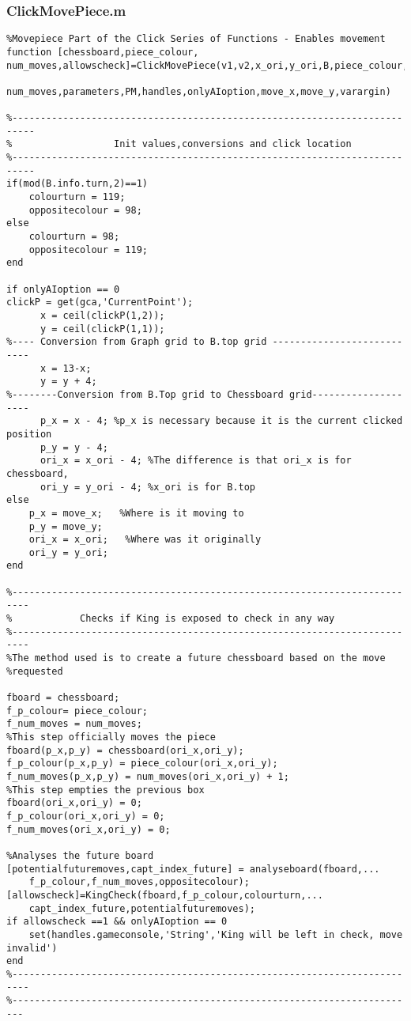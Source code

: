 \documentclass{article}
\begin{document}
\subsubsection{ClickMovePiece.m}
\begin{lstlisting}
%Movepiece Part of the Click Series of Functions - Enables movement
function [chessboard,piece_colour, num_moves,allowscheck]=ClickMovePiece(v1,v2,x_ori,y_ori,B,piece_colour,chessboard,...
    num_moves,parameters,PM,handles,onlyAIoption,move_x,move_y,varargin)

%--------------------------------------------------------------------------
%                  Init values,conversions and click location
%--------------------------------------------------------------------------
if(mod(B.info.turn,2)==1)
    colourturn = 119;
    oppositecolour = 98;
else
    colourturn = 98;
    oppositecolour = 119;
end

if onlyAIoption == 0
clickP = get(gca,'CurrentPoint');
      x = ceil(clickP(1,2));
      y = ceil(clickP(1,1));
%---- Conversion from Graph grid to B.top grid ---------------------------
      x = 13-x;      
      y = y + 4;
%--------Conversion from B.Top grid to Chessboard grid--------------------
      p_x = x - 4; %p_x is necessary because it is the current clicked position
      p_y = y - 4;
      ori_x = x_ori - 4; %The difference is that ori_x is for chessboard,
      ori_y = y_ori - 4; %x_ori is for B.top
else
    p_x = move_x;   %Where is it moving to
    p_y = move_y;
    ori_x = x_ori;   %Where was it originally
    ori_y = y_ori;
end
      
%-------------------------------------------------------------------------
%            Checks if King is exposed to check in any way
%-------------------------------------------------------------------------
%The method used is to create a future chessboard based on the move
%requested

fboard = chessboard;
f_p_colour= piece_colour;
f_num_moves = num_moves;
%This step officially moves the piece
fboard(p_x,p_y) = chessboard(ori_x,ori_y);
f_p_colour(p_x,p_y) = piece_colour(ori_x,ori_y);
f_num_moves(p_x,p_y) = num_moves(ori_x,ori_y) + 1;
%This step empties the previous box
fboard(ori_x,ori_y) = 0;
f_p_colour(ori_x,ori_y) = 0;
f_num_moves(ori_x,ori_y) = 0;

%Analyses the future board
[potentialfuturemoves,capt_index_future] = analyseboard(fboard,...
    f_p_colour,f_num_moves,oppositecolour);
[allowscheck]=KingCheck(fboard,f_p_colour,colourturn,...
    capt_index_future,potentialfuturemoves);
if allowscheck ==1 && onlyAIoption == 0
    set(handles.gameconsole,'String','King will be left in check, move invalid')
end
%-------------------------------------------------------------------------
%------------------------------------------------------------------------


\end{lstlisting}
\end{document}
